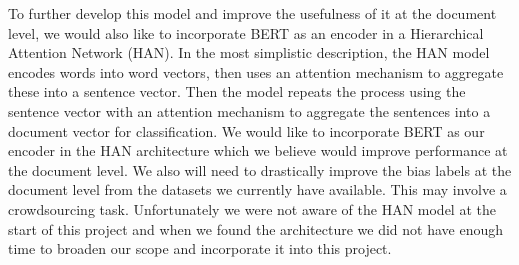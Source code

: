 \documentclass[10pt,a4paper,onecolumn]{article}
\begin{document}
To further develop this model and improve the usefulness of it at the document level, we would also like to incorporate BERT as an encoder in a Hierarchical Attention Network (HAN). In the most simplistic description, the HAN model encodes words into word vectors, then uses an attention mechanism to aggregate these into a sentence vector. Then the model repeats the process using the sentence vector with an attention mechanism to aggregate the sentences into a document vector for classification. We would like to incorporate BERT as our encoder in the HAN architecture which we believe would improve performance at the document level. We also will need to drastically improve the bias labels at the document level from the datasets we currently have available. This may involve a crowdsourcing task. Unfortunately we were not aware of the HAN model at the start of this project and when we found the architecture we did not have enough time to broaden our scope and incorporate it into this project.
\newpage


\end{document}
